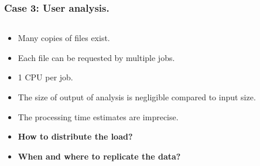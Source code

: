 \documentclass{beamer}
\begin{document}
\begin{frame}\frametitle{Case 3: User analysis. }
 	\begin{columns}[c] %
 	\begin{small}
 	\vspace{-10mm}
	\begin{block}{}
		\begin{itemize}
			\item Many copies of files exist.	
			\item Each file can be requested by multiple jobs.
			\item 1 CPU per job. 
			\item The size of output of analysis is negligible compared to input size.
			\item The processing time estimates  are imprecise.
			\item \textbf{How to distribute the load?}
			\item \textbf{When and where to replicate the data?}
		\end{itemize}
 	\end{block} 	
 	\end{small}


\end{columns}
\end{frame}
\end{document}
